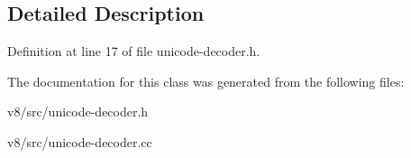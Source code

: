\subsection{Detailed Description}


Definition at line 17 of file unicode-\/decoder.\+h.



The documentation for this class was generated from the following files\+:\begin{DoxyCompactItemize}
\item 
v8/src/unicode-\/decoder.\+h\item 
v8/src/unicode-\/decoder.\+cc\end{DoxyCompactItemize}

